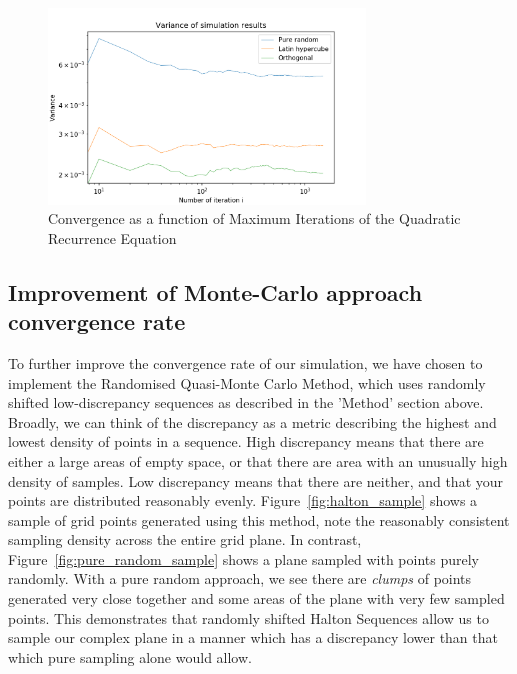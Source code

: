 \documentclass{article}
\begin{document}
    \begin{figure}[!tbp]
        \centering
        \includegraphics[width=0.75\textwidth]{pictures/part_3/q_3_iterations.png}
        \caption{Convergence as a function of Maximum Iterations of the Quadratic Recurrence Equation}
        \label{fig:stratified_it}
    \end{figure}

    \subsection{Improvement of Monte-Carlo approach convergence rate}

    To further improve the convergence rate of our simulation, we have chosen to implement the Randomised Quasi-Monte Carlo Method, which uses randomly shifted low-discrepancy sequences as described in the 'Method' section above. Broadly, we can think of the discrepancy as a metric describing the highest and lowest density of points in a sequence. High discrepancy means that there are either a large areas of empty space, or that there are area with an unusually high density of samples. Low discrepancy means that there are neither, and that your points are distributed reasonably evenly. Figure~\ref{fig:halton_sample} shows a sample of grid points generated using this method, note the reasonably consistent sampling density across the entire grid plane. In contrast,  Figure~\ref{fig:pure_random_sample} shows a plane sampled with points purely randomly. With a pure random approach, we see there are \emph{clumps} of points generated very close together and some areas of the plane with very few sampled points. This demonstrates that randomly shifted Halton Sequences allow us to sample our complex plane in a manner which has a discrepancy lower than that which pure sampling alone would allow.
\end{document}
